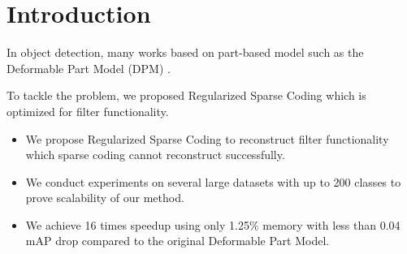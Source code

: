 \chapter{Introduction}
\label{c:intro}

In object detection, many works based on part-based model such as the Deformable Part Model (DPM) \cite{voc-release5}.

To tackle the problem, we proposed Regularized Sparse Coding which is optimized for filter functionality\protect\footnotemark[1].


\begin{itemize}
  \item We propose Regularized Sparse Coding to reconstruct filter functionality which sparse coding cannot reconstruct successfully.
  \item We conduct experiments on several large datasets with up to 200 classes to prove scalability of our method. 
  \item We achieve 16 times speedup using only 1.25\% memory with less than 0.04 mAP drop compared to the original Deformable Part Model.
\end{itemize}